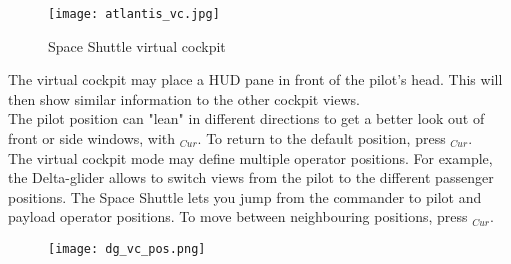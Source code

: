 \documentclass[Orbiter User Manual.tex]{subfiles}
\begin{document}
\begin{figure}[H]
  \centering
  \texttt{[image: atlantis\_vc.jpg]}
  \caption{Space Shuttle virtual cockpit}
\end{figure}

\noindent
The virtual cockpit may place a HUD pane in front of the pilot's head. This will then show similar information to the other cockpit views.\\
The pilot position can "lean" in different directions to get a better look out of front or side windows, with \Ctrl\Alt\UArrow\RArrow\LArrow$_{Cur}$. To return to the default position, press \Ctrl\Alt\DArrow$_{Cur}$.\\
The virtual cockpit mode may define multiple operator positions. For example, the Delta-glider allows to switch views from the pilot to the different passenger positions. The Space Shuttle lets you jump from the commander to pilot and payload operator positions. To move between neighbouring positions, press \Ctrl\UArrow\DArrow\RArrow\LArrow$_{Cur}$.

\begin{figure}[H]
  \centering
  \texttt{[image: dg\_vc\_pos.png]}
\end{figure}
\end{document}
